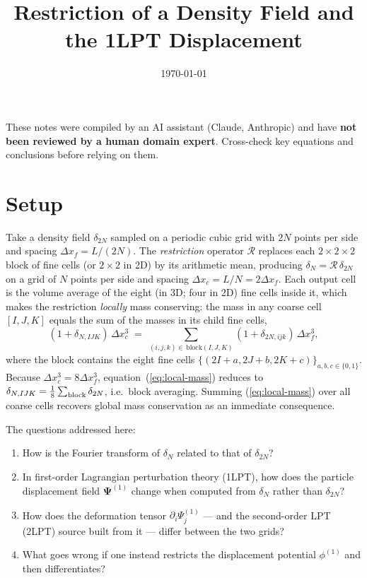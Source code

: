 \documentclass[12pt]{article}
\title{Restriction of a Density Field and the 1LPT Displacement}
\author{}
\date{\today}
\newcommand{\R}{\mathcal{R}}
\begin{document}
\maketitle

\begin{tcolorbox}[colback=yellow!10!white, colframe=orange!75!black,
                  title={\bfseries Disclaimer}]
These notes were compiled by an AI assistant (Claude, Anthropic) and have
\textbf{not been reviewed by a human domain expert}.  Cross-check key
equations and conclusions before relying on them.
\end{tcolorbox}

\section{Setup}

Take a density field $\delta_{2N}$ sampled on a periodic cubic grid with
$2N$ points per side and spacing $\Delta x_f = L/(2N)$. The
\emph{restriction} operator $\R$ replaces each $2\times2\times2$ block of
fine cells (or $2\times2$ in 2D) by its arithmetic mean, producing
$\delta_N = \R\,\delta_{2N}$ on a grid of $N$ points per side and spacing
$\Delta x_c = L/N = 2\Delta x_f$. Each output cell is the volume average
of the eight (in 3D; four in 2D) fine cells inside it, which makes the
restriction \emph{locally} mass conserving: the mass in any coarse cell
$[I,J,K]$ equals the sum of the masses in its child fine cells,
\begin{equation}\label{eq:local-mass}
  (1 + \delta_{N,IJK})\,\Delta x_c^3
  \;=\;\!\!\!\sum_{(i,j,k)\in\,\mathrm{block}(I,J,K)}\!\!\!
        (1 + \delta_{2N,ijk})\,\Delta x_f^3,
\end{equation}
where the block contains the eight fine cells $\{(2I+a,2J+b,2K+c)\}_{a,b,c\in\{0,1\}}$.
Because $\Delta x_c^3 = 8\Delta x_f^3$, equation~(\ref{eq:local-mass})
reduces to $\delta_{N,IJK} = \tfrac{1}{8}\sum_{\rm block}\delta_{2N}$,
i.e.\ block averaging. Summing (\ref{eq:local-mass}) over all coarse
cells recovers global mass conservation as an immediate consequence.

The questions addressed here:
\begin{enumerate}
\item How is the Fourier transform of $\delta_N$ related to that of
      $\delta_{2N}$?
\item In first-order Lagrangian perturbation theory (1LPT), how does
      the particle displacement field $\boldsymbol{\Psi}^{(1)}$ change
      when computed from $\delta_N$ rather than $\delta_{2N}$?
\item How does the deformation tensor $\partial_i\Psi_j^{(1)}$ --- and
      the second-order LPT (2LPT) source built from it --- differ
      between the two grids?
\item What goes wrong if one instead restricts the displacement
      potential $\phi^{(1)}$ and then differentiates?
\end{enumerate}
\end{document}
